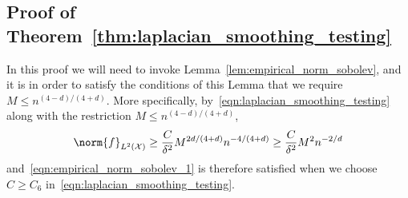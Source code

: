 \documentclass{article}
\newcommand{\1}{\mathbf{1}}
\newcommand{\Xset}{\mathcal{X}}
\newcommand{\Leb}{L}
\theoremstyle{alden}
\theoremstyle{aldenthm}
\theoremstyle{definition}
\theoremstyle{remark}
\begin{document}
\subsection{Proof of Theorem~\ref{thm:laplacian_smoothing_testing}}
In this proof we will need to invoke Lemma~\ref{lem:empirical_norm_sobolev}, and it is in order to satisfy the conditions of this Lemma that we require $M \leq n^{(4 - d)/(4 + d)}$. More specifically, by~\eqref{eqn:laplacian_smoothing_testing} along with the restriction $M \leq n^{(4 - d)/(4 + d)}$,
\begin{equation*}
\norm{f}_{\Leb^2(\Xset)} \geq \frac{C}{\delta^2} M^{2d/(4 + d)} n^{-4/(4 + d)} \geq \frac{C}{\delta^2} M^2 n^{-2/d}
\end{equation*}
and~\eqref{eqn:empirical_norm_sobolev_1} is therefore satisfied when we choose $C \geq C_6$ in~\eqref{eqn:laplacian_smoothing_testing}.
\end{document}

